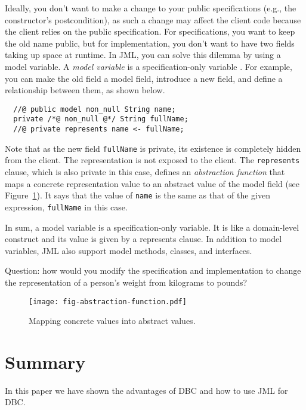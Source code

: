 \documentclass{jotarticle}
\begin{document}
Ideally, you don't want to make a change to your public specifications
(e.g., the constructor's postcondition), as such a change may affect
the client code because the client relies on the public 
specification.  For specifications, you want to keep the old name
public, but for implementation, you don't want to have two fields
taking up space at runtime.
In JML, you can solve this dilemma by using a model variable.  A
\emph{model variable} is a specification-only variable
\cite{Cheon-etal03}.  For example, you can make the old field a model
field, introduce a new field, and define a relationship between them,
as shown below.

\begin{verbatim}
  //@ public model non_null String name;
  private /*@ non_null @*/ String fullName;
  //@ private represents name <- fullName;
\end{verbatim}

Note that as the new field \texttt{fullName} is private, its existence
is completely hidden from the client. The representation is not
exposed to the client. The \texttt{represents} clause, which is also
private in this case, defines an \emph{abstraction function} that maps
a concrete representation value to an abstract value of the
model field (see Figure~\ref{fig-abstraction-function}).
It says that the value of \texttt{name}
is the same as that of the given expression,
\texttt{fullName} in this case.

In sum, a model variable is a specification-only variable. It is like
a domain-level construct and its value is given by a represents
clause.  In addition to model variables, JML also support model
methods, classes, and interfaces.

Question: how would you modify the specification and implementation to
change the representation of a person's weight from kilograms to
pounds?

\begin{figure}
\centerline{\texttt{[image: fig-abstraction-function.pdf]}}
\caption{Mapping concrete values into abstract values.}
\label{fig-abstraction-function}
\end{figure}

\section{Summary}

In this paper we have shown the advantages of DBC and how to use JML
for DBC.
\end{document}
